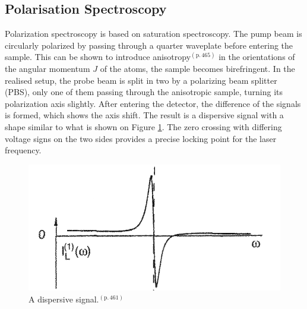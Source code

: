 \documentclass[twocolumn]{article}
\begin{document}
\subsection{Polarisation Spectroscopy}%
Polarization spectroscopy is based on saturation spectroscopy. The pump beam is circularly polarized by passing through a quarter waveplate before entering the sample. This can be shown to introduce anisotropy\cite{demtroder}$^{(\text{p.}\,465)}$ in the orientations of the angular momentum $J$ of the atoms, the sample becomes birefringent.
In the realised setup, the probe beam is split in two by a polarizing beam splitter (PBS),
only one of them passing through the anisotropic sample, turning its polarization axis slightly. After entering the detector, the difference of the signals is formed, which shows the axis shift. The result is a dispersive signal with a shape similar to what is shown on Figure \ref{fig:Dispersive}. The zero crossing with differing voltage signs on the two sides provides a precise locking point for the laser frequency.
\begin{figure}
\centering
\includegraphics[scale=0.3]{Images/Dispersive.png}
\caption{A dispersive signal.\cite{demtroder}$^{(\text{p.}\,461)}$}
\label{fig:Dispersive}
\end{figure}

\end{document}
